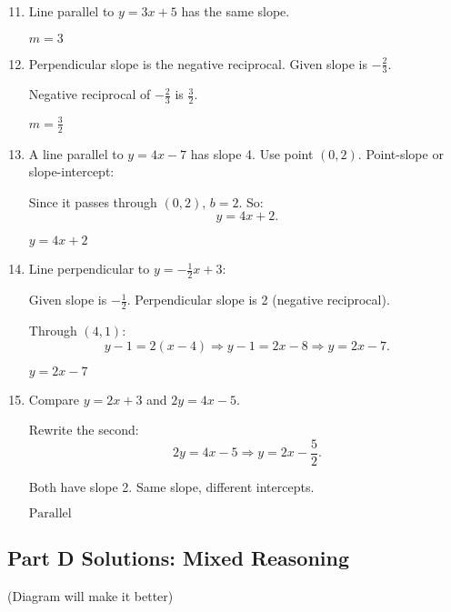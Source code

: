 \documentclass[12pt]{article}
\begin{document}
\begin{enumerate}
  \setcounter{enumi}{10}
  \item Line parallel to \(y = 3x + 5\) has the same slope.

  \(\boxed{m = 3}\)

  \item Perpendicular slope is the negative reciprocal.  
  Given slope is \(-\tfrac{2}{3}.\)

  Negative reciprocal of \(-\tfrac{2}{3}\) is \(\tfrac{3}{2}.\)

  \(\boxed{m = \tfrac{3}{2}}\)

  \item A line parallel to \(y = 4x - 7\) has slope 4.  
  Use point \((0,2)\). Point-slope or slope-intercept:

  Since it passes through \((0,2)\), \(b = 2\). So:
  \[
  y = 4x + 2.
  \]

  \(\boxed{y = 4x + 2}\)

  \item Line perpendicular to \(y = -\tfrac{1}{2}x + 3\):

  Given slope is \(-\tfrac{1}{2}.\)  
  Perpendicular slope is 2 (negative reciprocal).

  Through \((4,1)\):
  \[
  y - 1 = 2(x - 4)
  \Rightarrow y - 1 = 2x - 8
  \Rightarrow y = 2x - 7.
  \]

  \(\boxed{y = 2x - 7}\)

  \item Compare \(y = 2x + 3\) and \(2y = 4x - 5.\)

  Rewrite the second:
  \[
  2y = 4x - 5 \Rightarrow y = 2x - \frac{5}{2}.
  \]

  Both have slope 2. Same slope, different intercepts.

  \(\boxed{\text{Parallel}}\)
\end{enumerate}

\subsection*{Part D Solutions: Mixed Reasoning}
(Diagram will make it better)
\end{document}
